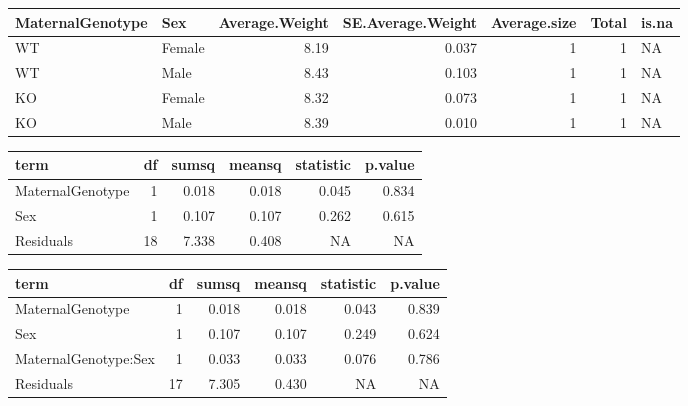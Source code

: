 \documentclass[]{article}
\begin{document}
\begin{longtable}[]{@{}llrrrrl@{}}
\toprule
MaternalGenotype & Sex & Average.Weight & SE.Average.Weight &
Average.size & Total & is.na\tabularnewline
\midrule
\endhead
WT & Female & 8.19 & 0.037 & 1 & 1 & NA\tabularnewline
WT & Male & 8.43 & 0.103 & 1 & 1 & NA\tabularnewline
KO & Female & 8.32 & 0.073 & 1 & 1 & NA\tabularnewline
KO & Male & 8.39 & 0.010 & 1 & 1 & NA\tabularnewline
\bottomrule
\end{longtable}

\begin{longtable}[]{@{}lrrrrr@{}}
\toprule
term & df & sumsq & meansq & statistic & p.value\tabularnewline
\midrule
\endhead
MaternalGenotype & 1 & 0.018 & 0.018 & 0.045 & 0.834\tabularnewline
Sex & 1 & 0.107 & 0.107 & 0.262 & 0.615\tabularnewline
Residuals & 18 & 7.338 & 0.408 & NA & NA\tabularnewline
\bottomrule
\end{longtable}

\begin{longtable}[]{@{}lrrrrr@{}}
\toprule
term & df & sumsq & meansq & statistic & p.value\tabularnewline
\midrule
\endhead
MaternalGenotype & 1 & 0.018 & 0.018 & 0.043 & 0.839\tabularnewline
Sex & 1 & 0.107 & 0.107 & 0.249 & 0.624\tabularnewline
MaternalGenotype:Sex & 1 & 0.033 & 0.033 & 0.076 & 0.786\tabularnewline
Residuals & 17 & 7.305 & 0.430 & NA & NA\tabularnewline
\bottomrule
\end{longtable}
\end{document}
